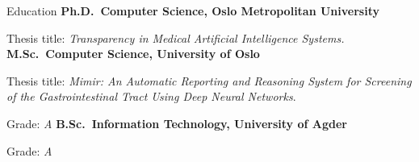\begin{rubric}{Education}
\entry*[2018 -- 2022]%
	\textbf{Ph.D.~Computer Science, Oslo Metropolitan University}
	\par Thesis title: \emph{Transparency in Medical Artificial Intelligence Systems.}
%
\entry*[2016 -- 2018]%
	\textbf{M.Sc.~Computer Science, University of Oslo} \par
	Thesis title: \emph{Mimir: An Automatic Reporting and Reasoning System for Screening of the Gastrointestinal Tract Using Deep Neural Networks}. \par
    Grade: \emph{A}
% 
\entry*[2012 -- 2015]%
	\textbf{B.Sc.~Information Technology, University of Agder} \par
        Grade: \emph{A}
\end{rubric}
